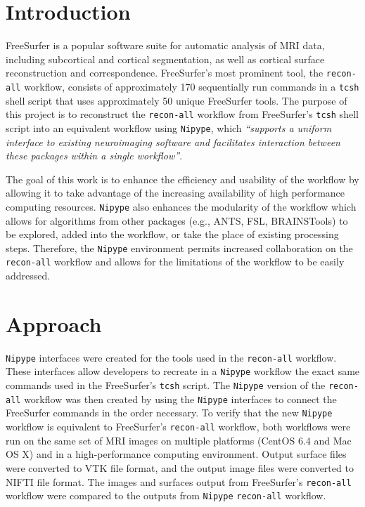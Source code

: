 \documentclass[twocolumn]{bmcart}%
\begin{document}

\section{Introduction}\label{introduction}

FreeSurfer\cite{Fischl2012} is a popular software suite for automatic analysis of MRI data, including subcortical and cortical segmentation, as well as cortical surface reconstruction and correspondence.
FreeSurfer's most prominent tool, the \texttt{recon-all} workflow, consists of approximately 170 sequentially run commands in a \texttt{tcsh} shell script that uses approximately 50 unique FreeSurfer tools.
The purpose of this project is to reconstruct the  \texttt{recon-all} workflow from FreeSurfer's \texttt{tcsh} shell script into an equivalent workflow using \texttt{Nipype}, which \textit{``supports a uniform interface to existing neuroimaging software and facilitates interaction between these packages within a single workflow''}\cite{Gorgolewski2011}.

The goal of this work is to enhance the efficiency and usability of the workflow by allowing it to take advantage of the increasing availability of high performance computing resources.
\texttt{Nipype} also enhances the modularity of the workflow which allows for algorithms from other packages (e.g., ANTS\cite{Avants2009}, FSL\cite{Woolrich2009}, BRAINSTools\cite{YoungKim2013}\cite{Kim2014}\cite{Kim2015}) to be explored, added into the workflow, or take the place of existing processing steps.
Therefore, the \texttt{Nipype} environment permits increased collaboration on the \texttt{recon-all} workflow and allows for the limitations of the workflow to be easily addressed.


\section{Approach}\label{approach}
\texttt{Nipype} interfaces were created for the tools used in the \texttt{recon-all} workflow.
These interfaces allow developers to recreate in a  \texttt{Nipype} workflow the exact same commands used in the FreeSurfer's \texttt{tcsh} script.
The \texttt{Nipype} version of the \texttt{recon-all} workflow was then created by using the \texttt{Nipype} interfaces to connect the FreeSurfer commands in the order necessary.
To verify that the new \texttt{Nipype} workflow is equivalent to FreeSurfer's \texttt{recon-all} workflow, both workflows were run on the same set of MRI images on multiple platforms (CentOS 6.4 and Mac OS X) and in a high-performance computing environment.
Output surface files were converted to VTK file format, and the output image files were converted to NIFTI file format.
The images and surfaces output from FreeSurfer's \texttt{recon-all} workflow were compared to the outputs from  \texttt{Nipype} \texttt{recon-all} workflow.
\end{document}
